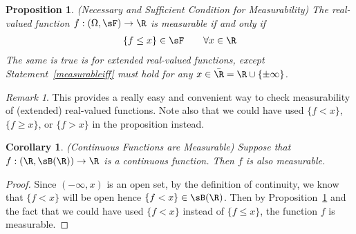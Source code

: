 \documentclass[12pt]{article}
\theoremstyle{plain}
\newtheorem{prop}[thm]{Proposition}
\newtheorem{cor}[thm]{Corollary}
\theoremstyle{definition}
\theoremstyle{remark}
\newtheorem*{rmk}{Remark}
\newcommand{\ra}{\rightarrow}
\begin{document}
\begin{prop}
\label{prop:measurableiff}
\emph{(Necessary and Sufficient Condition for Measurability)}
The real-valued function $f:(\Omega,\sF)\ra\R$ is measurable if and only
if
\begin{align}
  \{f\leq x\}
  \in \sF
  \qquad \forall x\in\R
  \label{measurableiff}
\end{align}
The same is true is for \emph{extended} real-valued functions, except
Statement~\ref{measurableiff} must hold for any
$x\in\bar{\R}=\R\cup\{\pm\infty\}$.
\end{prop}
\begin{rmk}
This provides a really easy and convenient way to check measurability of
(extended) real-valued functions. Note also that we could have used
$\{f<x\}$, $\{f\geq x\}$, or $\{f>x\}$ in the proposition instead.
\end{rmk}

\begin{cor}\emph{(Continuous Functions are Measurable)}
Suppose that $f:(\R,\sB(\R))\ra\R$ is a continuous function. Then $f$ is
also measurable.
\end{cor}
\begin{proof}
Since $(-\infty,x)$ is an open set, by the definition of continuity, we
know that $\{f<x\}$ will be open hence $\{f<x\}\in\sB(\R)$. Then by
Proposition~\ref{prop:measurableiff} and the fact that we could have
used $\{f<x\}$ instead of $\{f\leq x\}$, the function $f$ is measurable.
\end{proof}
\end{document}
